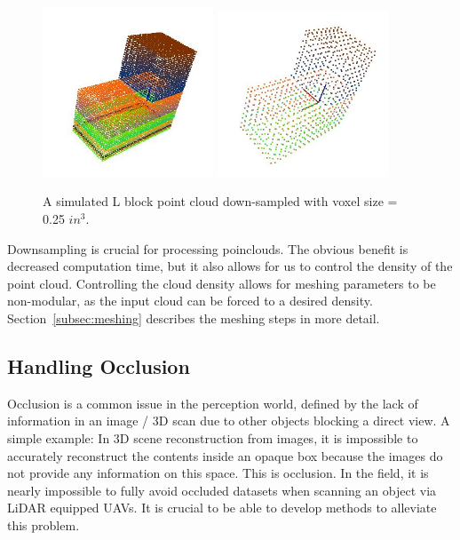 \documentclass[12pt]{drexelthesis}
\let\Oldsubsection\subsection
\renewcommand{\subsection}{\FloatBarrier\Oldsubsection}
\begin{document}
\begin{figure}[!ht]
	\centering
		\includegraphics[width=2in]{l_block_pt_cloud} \includegraphics[width=2in]{l_block_pt_cloudDOWNSAMPLE025.jpg}
	\caption[Effects of down-sampling on simulated point cloud objects]{\centering A simulated L block point cloud down-sampled with voxel size = 0.25 $in^{3}$.}
	\label{intro:downsampling}
\end{figure}

Downsampling is crucial for processing poinclouds. The obvious benefit is decreased computation time, but it also allows for us to control the density of the point cloud. Controlling the cloud density allows for meshing parameters to be non-modular, as the input cloud can be forced to a desired density. Section~\ref{subsec:meshing} describes the meshing steps in more detail.

\subsection{Handling Occlusion} 
Occlusion is a common issue in the perception world, defined by the lack of information in an image / 3D scan due to other objects blocking a direct view. A simple example: In 3D scene reconstruction from images, it is impossible to accurately reconstruct the contents inside an opaque box because the images do not provide any information on this space. This is occlusion. In the field, it is nearly impossible to fully avoid occluded datasets when scanning an object via LiDAR equipped UAVs. It is crucial to be able to develop methods to alleviate this problem.
\end{document}
